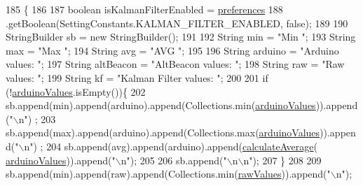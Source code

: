 \begin{DoxyCode}
185                              \{
186 
187         \textcolor{keywordtype}{boolean} isKalmanFilterEnabled =  \hyperlink{classit_1_1unibo_1_1torsello_1_1bluetoothpositioning_1_1util_1_1ReportUtils_af1f57227f8c42073b4f8f2b65e86ebd7_af1f57227f8c42073b4f8f2b65e86ebd7}{preferences}
188                 .getBoolean(SettingConstants.KALMAN\_FILTER\_ENABLED, \textcolor{keyword}{false});
189 
190         StringBuilder sb = \textcolor{keyword}{new} StringBuilder();
191 
192         String min = \textcolor{stringliteral}{"Min "};
193         String max = \textcolor{stringliteral}{"Max "};
194         String avg = \textcolor{stringliteral}{"AVG "};
195 
196         String arduino = \textcolor{stringliteral}{"Arduino values: "};
197         String altBeacon = \textcolor{stringliteral}{"AltBeacon values: "};
198         String raw = \textcolor{stringliteral}{"Raw values: "};
199         String kf = \textcolor{stringliteral}{"Kalman Filter values: "};
200 
201         \textcolor{keywordflow}{if} (!\hyperlink{classit_1_1unibo_1_1torsello_1_1bluetoothpositioning_1_1util_1_1ReportUtils_a3557dcc1662461b46fcd4d18eee9780e_a3557dcc1662461b46fcd4d18eee9780e}{arduinoValues}.isEmpty())\{
202             sb.append(min).append(arduino).append(Collections.min(\hyperlink{classit_1_1unibo_1_1torsello_1_1bluetoothpositioning_1_1util_1_1ReportUtils_a3557dcc1662461b46fcd4d18eee9780e_a3557dcc1662461b46fcd4d18eee9780e}{arduinoValues})).append(\textcolor{stringliteral}{"\(\backslash\)n"})
      ;
203             sb.append(max).append(arduino).append(Collections.max(\hyperlink{classit_1_1unibo_1_1torsello_1_1bluetoothpositioning_1_1util_1_1ReportUtils_a3557dcc1662461b46fcd4d18eee9780e_a3557dcc1662461b46fcd4d18eee9780e}{arduinoValues})).append(\textcolor{stringliteral}{"\(\backslash\)n"})
      ;
204             sb.append(avg).append(arduino).append(\hyperlink{classit_1_1unibo_1_1torsello_1_1bluetoothpositioning_1_1util_1_1ReportUtils_a3585d9c21128af8bb2befe5cf069ba1e_a3585d9c21128af8bb2befe5cf069ba1e}{calculateAverage}(
      \hyperlink{classit_1_1unibo_1_1torsello_1_1bluetoothpositioning_1_1util_1_1ReportUtils_a3557dcc1662461b46fcd4d18eee9780e_a3557dcc1662461b46fcd4d18eee9780e}{arduinoValues})).append(\textcolor{stringliteral}{"\(\backslash\)n"});
205 
206             sb.append(\textcolor{stringliteral}{"\(\backslash\)n\(\backslash\)n"});
207         \}
208 
209         sb.append(min).append(raw).append(Collections.min(\hyperlink{classit_1_1unibo_1_1torsello_1_1bluetoothpositioning_1_1util_1_1ReportUtils_adbe56bea0813a48932ef94b8b27c3314_adbe56bea0813a48932ef94b8b27c3314}{rawValues})).append(\textcolor{stringliteral}{"\(\backslash\)n"});

\end{DoxyCode}
